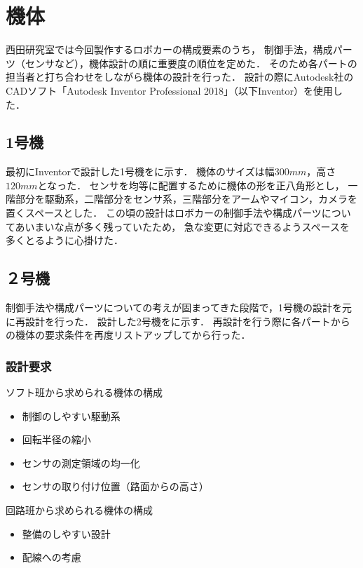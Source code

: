 \documentclass[11pt,a4]{jsarticle}
\begin{document}
\section{機体}  %

  西田研究室では今回製作するロボカーの構成要素のうち，
  制御手法，構成パーツ（センサなど），機体設計の順に重要度の順位を定めた．
  そのため各パートの担当者と打ち合わせをしながら機体の設計を行った．
  設計の際にAutodesk社のCADソフト「Autodesk Inventor Professional 2018」（以下Inventor）を使用した．

  \subsection{1号機}
    最初にInventorで設計した1号機をに示す．
    機体のサイズは幅$300\unit{mm}$，高さ$120\unit{mm}$となった．
    センサを均等に配置するために機体の形を正八角形とし，
    一階部分を駆動系，二階部分をセンサ系，三階部分をアームやマイコン，カメラを置くスペースとした．
    この頃の設計はロボカーの制御手法や構成パーツについてあいまいな点が多く残っていたため，
    急な変更に対応できるようスペースを多くとるように心掛けた．


  \subsection{２号機}
    制御手法や構成パーツについての考えが固まってきた段階で，1号機の設計を元に再設計を行った．
    設計した2号機をに示す．
    再設計を行う際に各パートからの機体の要求条件を再度リストアップしてから行った．

    \subsubsection{設計要求}
      ソフト班から求められる機体の構成
      \begin{itemize}
       \item 制御のしやすい駆動系
       \item 回転半径の縮小
       \item センサの測定領域の均一化
       \item センサの取り付け位置（路面からの高さ）
      \end{itemize}

      回路班から求められる機体の構成
      \begin{itemize}
       \item 整備のしやすい設計
       \item 配線への考慮
      \end{itemize}
\end{document}
